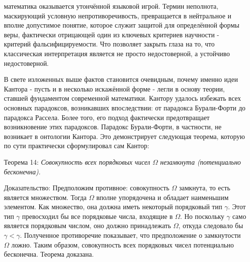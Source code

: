 \documentclass[12pt]{article}
\begin{document}
математика оказывается утончённой языковой игрой. Термин неполнота, маскирующий условную непротиворечивость, превращается в нейтральное и вполне допустимое понятие, которое служит защитой для определённой формы веры, фактически отрицающей один из ключевых критериев научности - критерий фальсифицируемости. Что позволяет закрыть глаза на то, что классическая интерпретация является не просто недостоверной, а устойчиво недостоверной.

В свете изложенных выше фактов становится очевидным, почему именно идеи Кантора - пусть и в несколько искажённой форме - легли в основу теории, ставшей фундаментом современной математики. Кантору удалось избежать всех основных парадоксов, возникавших впоследствии: от парадокса Бурали-Форти до парадокса Рассела. Более того, его подход фактически предотвращает возникновение этих парадоксов. Парадокс Бурали-Форти, в частности, не возникает в онтологии Кантора. Это демонстрирует следующая теорема, которую по сути практически сформулировал сам Кантор:

Теорема 14: {\sl Совокупность всех порядковых чисел $\Omega$ незамкнута (потенциально бесконечна).}

Доказательство: 
Предположим противное: совокупность $\Omega$ замкнута, то есть является множеством. Тогда $\Omega$ вполне упорядочена и обладает наименьшим элементом. Как множество, она должна иметь некоторый порядковый тип $\gamma$. Этот тип $\gamma$ превосходил бы все порядковые числа, входящие в $\Omega$. Но поскольку $\gamma$ само является порядковым числом, оно должно принадлежать $\Omega$, откуда следовало бы $\gamma < \gamma$. Полученное противоречие показывает, что предположение о замкнутости $\Omega$ ложно. Таким образом, совокупность всех порядковых чисел потенциально бесконечна. Теорема доказана.
\end{document}
